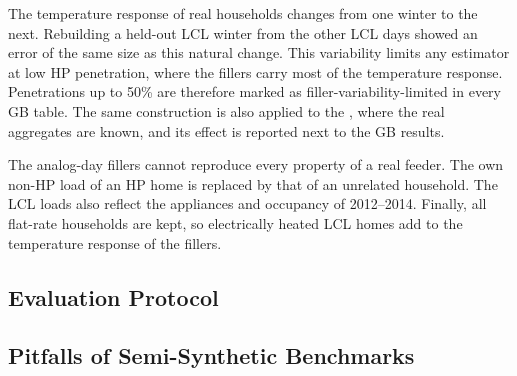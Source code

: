 The temperature response of real households changes from one winter to the next. Rebuilding a held-out LCL winter from the other LCL days showed an error of the same size as this natural change. This variability limits any estimator at low HP penetration, where the fillers carry most of the temperature response. Penetrations up to 50\% are therefore marked as filler-variability-limited in every GB table. The same construction is also applied to the \dataCH, where the real aggregates are known, and its effect is reported next to the GB results.

The analog-day fillers cannot reproduce every property of a real feeder. The own non-HP load of an HP home is replaced by that of an unrelated household. The LCL loads also reflect the appliances and occupancy of 2012--2014. Finally, all flat-rate households are kept, so electrically heated LCL homes add to the temperature response of the fillers.

\subsection{Evaluation Protocol}
\label{sec:protocol}

\subsection{Pitfalls of Semi-Synthetic Benchmarks}
\label{sec:pitfalls}
